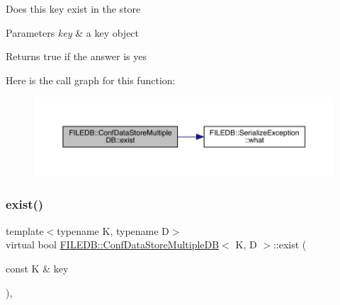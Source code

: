 Does this key exist in the store 
\begin{DoxyParams}{Parameters}
{\em key} & a key object \\
\hline
\end{DoxyParams}
\begin{DoxyReturn}{Returns}
true if the answer is yes 
\end{DoxyReturn}
Here is the call graph for this function\+:
\nopagebreak
\begin{figure}[H]
\begin{center}
\leavevmode
\includegraphics[width=350pt]{d3/dc0/classFILEDB_1_1ConfDataStoreMultipleDB_ad80312a9a4767f3b0b567932542d3ee7_cgraph}
\end{center}
\end{figure}
\mbox{\label{classFILEDB_1_1ConfDataStoreMultipleDB_ad80312a9a4767f3b0b567932542d3ee7}} 
\subsubsection{\texorpdfstring{exist()}{exist()}\hspace{0.1cm}{\footnotesize\ttfamily [2/2]}}
{\footnotesize\ttfamily template$<$typename K, typename D$>$ \\
virtual bool \mbox{\hyperlink{classFILEDB_1_1ConfDataStoreMultipleDB}{F\+I\+L\+E\+D\+B\+::\+Conf\+Data\+Store\+Multiple\+DB}}$<$ K, D $>$\+::exist (\begin{DoxyParamCaption}\item[{const K \&}]{key }\end{DoxyParamCaption})\hspace{0.3cm}{\ttfamily [inline]}, {\ttfamily [virtual]}}

